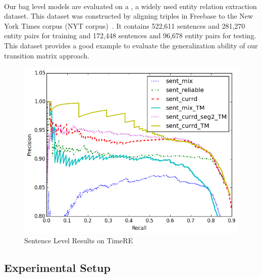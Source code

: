 \paragraph{\EntityRE} Our bag level models are evaluated on a \EntityRE, a widely used entity
relation extraction dataset. This dataset was constructed by aligning triples
in Freebase to the New York Times corpus (NYT
corpus)~\cite{riedel2010modeling}. It contains 522,611 sentences and 281,270
entity pairs for training and  172,448 sentences and 96,678 entity pairs for
testing. This dataset provides a good example to evaluate the generalization
ability of our transition matrix approach. 


\begin{figure}[t!]
\begin{center}
\includegraphics[width=0.9\linewidth]{figures/sent_time_exp_overall.png}
\caption{Sentence Level Results on TimeRE}
\label{fig: sent_luo}
\end{center}
\end{figure}

\subsection{Experimental Setup}

